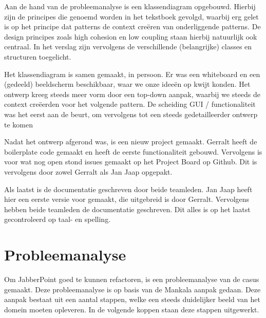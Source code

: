 \documentclass[a4paper]{article}
\newcommand{\1}[0]{\'{e}\'{e}n}
\begin{document}
Aan de hand van de probleemanalyse is een klassendiagram opgebouwd. Hierbij zijn de principes die genoemd worden in het tekstboek gevolgd, waarbij erg gelet is op het principe dat patterns de context creëren van onderliggende patterns. De design principes zoals high cohesion en low coupling staan hierbij natuurlijk ook centraal. In het verslag zijn vervolgens de verschillende (belangrijke) classes en structuren toegelicht.

Het klassendiagram is samen gemaakt, in persoon. Er was een whiteboard en een (gedeeld) beeldscherm beschikbaar, waar we onze idee\"{e}n op kwijt konden. Het ontwerp kreeg steeds meer vorm door een top-down aanpak, waarbij we steeds de context cre\"{e}erden voor het volgende pattern. De scheiding GUI / functionaliteit was het eerst aan de beurt, om vervolgens tot een steeds gedetailleerder ontwerp te komen

Nadat het ontwerp afgerond was, is een nieuw project gemaakt. Gerralt heeft de boilerplate code gemaakt en heeft de eerste functionaliteit gebouwd. Vervolgens is voor wat nog open stond issues gemaakt op het Project Board op Github. Dit is vervolgens door zowel Gerralt als Jan Jaap opgepakt.

Als laatst is de documentatie geschreven door beide teamleden. Jan Jaap heeft hier een eerste versie voor gemaakt, die uitgebreid is door Gerralt. Vervolgens hebben beide teamleden de documentatie geschreven. Dit alles is op het laatst gecontroleerd op taal- en spelling.

\section{Probleemanalyse}
Om JabberPoint goed te kunnen refactoren, is een probleemanalyse van de casus gemaakt. Deze probleemanalyse is op basis van de Mankala aanpak gedaan. Deze aanpak bestaat uit een aantal stappen, welke een steeds duidelijker beeld van het domein moeten opleveren. In de volgende koppen staan deze stappen uitgewerkt.
\end{document}
